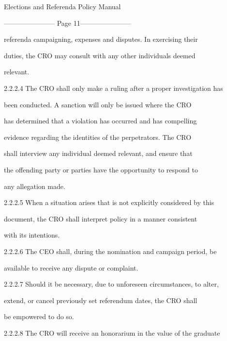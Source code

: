                            Elections and Referenda Policy Manual  

  


----------------------- Page 11-----------------------

               referenda campaigning, expenses and disputes. In exercising their  

               duties, the CRO may consult with any other individuals deemed  

               relevant.   

  

2.2.2.4        The CRO shall only make a ruling after a proper investigation has  

               been conducted. A sanction  will only  be  issued  where the  CRO  

               has determined that a violation has occurred and has compelling  

               evidence  regarding  the  identities  of  the  perpetrators.  The  CRO  

               shall  interview  any  individual  deemed  relevant,  and  ensure  that  

               the offending party or parties have the opportunity to respond  to  

               any allegation made.   

  

2.2.2.5        When  a  situation  arises  that  is  not  explicitly  considered  by  this  

               document, the CRO shall interpret policy in a manner consistent  

               with its intentions.   

  

  

  

2.2.2.6        The  CEO  shall, during the nomination  and  campaign period,  be  

               available to receive any dispute or complaint.   

  

2.2.2.7        Should it be necessary, due to unforeseen circumstances, to alter,  

               extend, or cancel previously set referendum dates, the CRO shall  

               be empowered to do so.   

2.2.2.8        The CRO will receive an honorarium in the value of the graduate  

